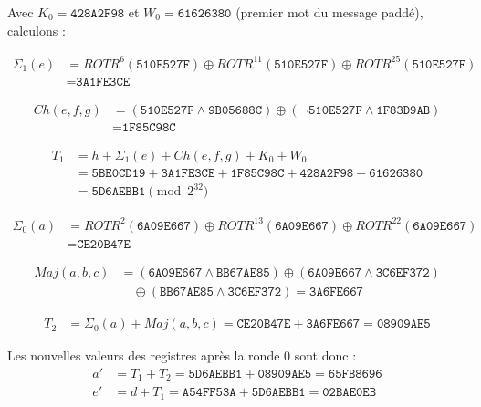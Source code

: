 Avec $K_0 = \texttt{428A2F98}$ et $W_0 = \texttt{61626380}$ (premier mot du message paddé), calculons :

\begin{align*}
\Sigma_1(e) &= ROTR^6(\texttt{510E527F}) \oplus ROTR^{11}(\texttt{510E527F}) \oplus ROTR^{25}(\texttt{510E527F}) \\
            &= \texttt{3A1FE3CE}
\end{align*}

\begin{align*}
Ch(e,f,g) &= (\texttt{510E527F} \wedge \texttt{9B05688C}) \oplus (\neg\texttt{510E527F} \wedge \texttt{1F83D9AB}) \\
           &= \texttt{1F85C98C}
\end{align*}

\begin{align*}
T_1 &= h + \Sigma_1(e) + Ch(e,f,g) + K_0 + W_0 \\
    &= \texttt{5BE0CD19} + \texttt{3A1FE3CE} + \texttt{1F85C98C} + \texttt{428A2F98} + \texttt{61626380} \\
    &= \texttt{5D6AEBB1} \pmod{2^{32}}
\end{align*}

\begin{align*}
\Sigma_0(a) &= ROTR^2(\texttt{6A09E667}) \oplus ROTR^{13}(\texttt{6A09E667}) \oplus ROTR^{22}(\texttt{6A09E667}) \\
            &= \texttt{CE20B47E}
\end{align*}

\begin{align*}
Maj(a,b,c) &= (\texttt{6A09E667} \wedge \texttt{BB67AE85}) \oplus (\texttt{6A09E667} \wedge \texttt{3C6EF372}) \\
           &\quad \oplus (\texttt{BB67AE85} \wedge \texttt{3C6EF372}) = \texttt{3A6FE667}
\end{align*}

\begin{align*}
T_2 &= \Sigma_0(a) + Maj(a,b,c) = \texttt{CE20B47E} + \texttt{3A6FE667} = \texttt{08909AE5}
\end{align*}

Les nouvelles valeurs des registres après la ronde 0 sont donc :
\begin{align*}
a' &= T_1 + T_2 = \texttt{5D6AEBB1} + \texttt{08909AE5} = \texttt{65FB8696} \\
e' &= d + T_1 = \texttt{A54FF53A} + \texttt{5D6AEBB1} = \texttt{02BAE0EB}
\end{align*}

